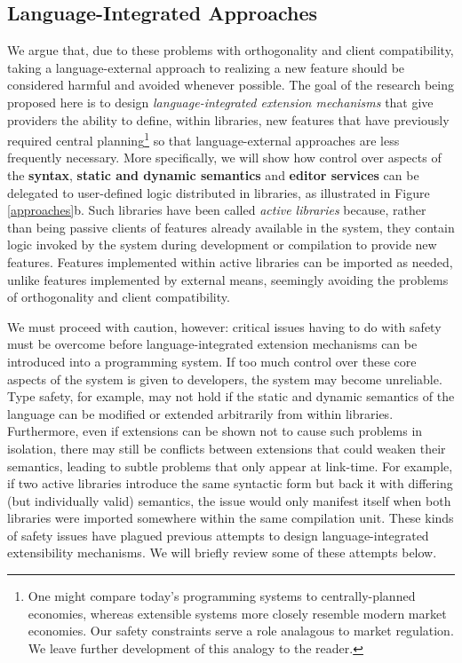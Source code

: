 \subsection{Language-Integrated Approaches}\label{language-integrated-approaches}
We argue that, due to these problems with orthogonality and client compatibility, taking a language-external approach to realizing a new feature should be considered harmful and avoided whenever possible. The goal of the research being proposed here is to design \emph{language-integrated extension mechanisms} that give providers the ability to define, within libraries, new features that have previously required central planning\footnote{One might compare today's programming systems to  {centrally-planned} economies, whereas extensible\- systems more closely resemble modern market economies. Our safety constraints serve a role analagous to market regulation. We leave further development of this analogy to the reader.} so that language-external approaches are less frequently necessary. More specifically, we will show how control over aspects of the \textbf{syntax}, \textbf{static and dynamic semantics} and \textbf{editor services} can be delegated to user-defined logic distributed in {libraries}, as illustrated in Figure \ref{approaches}b. 
Such libraries have been called \emph{active libraries}  \cite{activelibraries} because, rather than being passive clients of features already available in the system, they contain logic invoked by the system during development or compilation to provide new features. Features implemented within active libraries can be imported as needed, unlike features implemented by external means, seemingly avoiding the problems of orthogonality and client compatibility.

We must proceed with caution, however: critical issues having to do with {safety} must be overcome before language-integrated extension mechanisms can be introduced into a programming system. If too much control over  these core aspects of the system is given  to developers, the system may become unreliable. 
Type safety, for example, may not hold if the static and dynamic semantics of the language can be modified or extended arbitrarily from within libraries. Furthermore, even if extensions can be shown not to cause such problems in isolation, there may still be conflicts between extensions that could weaken their semantics, leading to subtle problems that only appear at link-time. For example, if two active libraries introduce the same syntactic form but back it with differing (but individually valid) semantics, the issue would only manifest itself when both libraries were imported somewhere within the same compilation unit. These kinds of safety issues have plagued previous attempts to design language-integrated extensibility mechanisms. We will briefly review some of these attempts below.%


